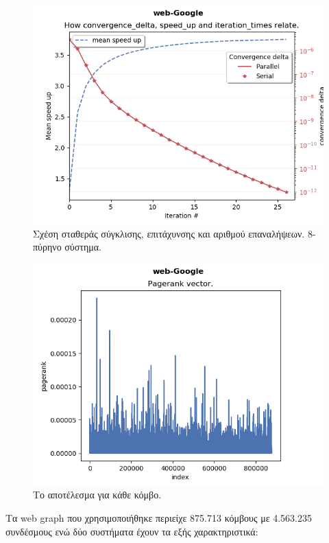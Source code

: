 \begin{center}
\begin{figure}
\includegraphics[width=\linewidth]{plots/speed_up_diades.png}
\caption{Σχέση σταθεράς σύγκλισης, επιτάχυνσης και αριθμού επαναλήψεων. 8-πύρηνο σύστημα.}
\end{figure}

\begin{figure}
\includegraphics[width=\linewidth]{plots/pagerank.png}
\caption{Το αποτέλεσμα για κάθε κόμβο.}
\end{figure}

\end{center}
Τα web graph που χρησιμοποιήθηκε περιείχε 875.713 κόμβους με 4.563.235 συνδέσμους ενώ δύο συστήματα έχουν τα εξής χαρακτηριστικά: 
